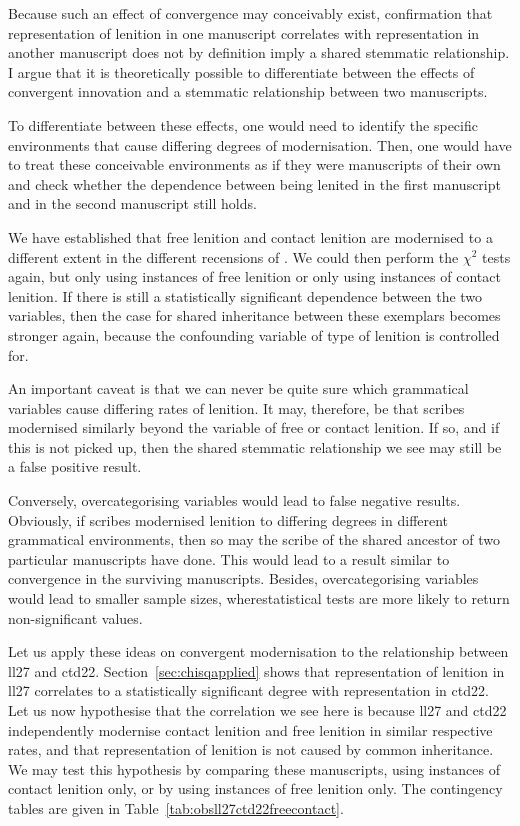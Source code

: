 Because such an effect of convergence may conceivably exist, confirmation that representation of lenition in one manuscript correlates with representation in another manuscript does not by definition imply a shared stemmatic relationship. I argue that it is theoretically possible to differentiate between the effects of convergent innovation and a stemmatic relationship between two manuscripts.

To differentiate between these effects, one would need to identify the specific environments that cause differing degrees of modernisation. Then, one would have to treat these conceivable environments as if they were manuscripts of their own and check whether the dependence between being lenited in the first manuscript and in the second manuscript still holds.

We have established that free lenition and contact lenition are modernised to a different extent in the different recensions of . We could then perform the \(\chi^2\) tests again, but only using instances of free lenition or only using instances of contact lenition. If there is still a statistically significant dependence between the two variables, then the case for shared inheritance between these exemplars becomes stronger again, because the confounding variable of type of lenition is controlled for.

An important caveat is that we can never be quite sure which grammatical variables cause differing rates of lenition. It may, therefore, be that scribes modernised similarly beyond the variable of free or contact lenition. If so, and if this is not picked up, then the shared stemmatic relationship we see may still be a false positive result.

Conversely, overcategorising variables would lead to false negative results. Obviously, if scribes modernised lenition to differing degrees in different grammatical environments, then so may the scribe of the shared ancestor of two particular manuscripts have done. This would lead to a result similar to convergence in the surviving manuscripts. Besides, overcategorising variables would lead to smaller sample sizes, wherestatistical tests are more likely to return non-significant values.

Let us apply these ideas on convergent modernisation to the relationship between \gls{ll27} and \gls{ctd22}. Section~\ref{sec:chisqapplied} shows that representation of lenition in \gls{ll27} correlates to a statistically significant degree with representation in \gls{ctd22}. Let us now hypothesise that the correlation we see here is because \gls{ll27} and \gls{ctd22} independently modernise contact lenition and free lenition in similar respective rates, and that representation of lenition is not caused by common inheritance. We may test this hypothesis by comparing these manuscripts, using instances of contact lenition only, or by using instances of free lenition only. The contingency tables are given in Table~\ref{tab:obsll27ctd22freecontact}.

